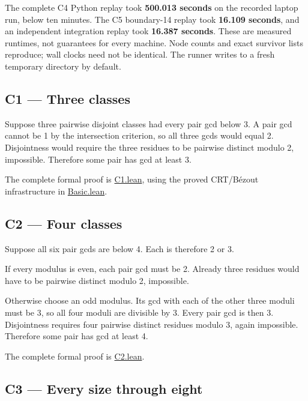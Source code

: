 \documentclass[11pt,a4paper]{article}
\begin{document}
The complete C4 Python replay took \textbf{500.013 seconds} on the recorded laptop run, below ten minutes. The C5 boundary-14 replay took \textbf{16.109 seconds}, and an independent integration replay took \textbf{16.387 seconds}. These are measured runtimes, not guarantees for every machine. Node counts and exact survivor lists reproduce; wall clocks need not be identical. The runner writes to a fresh temporary directory by default.

\subsection{C1 --- Three classes}\label{c1-three-classes}

Suppose three pairwise disjoint classes had every pair gcd below 3. A pair gcd cannot be 1 by the intersection criterion, so all three gcds would equal 2. Disjointness would require the three residues to be pairwise distinct modulo 2, impossible. Therefore some pair has gcd at least 3.

The complete formal proof is \href{https://github.com/mpelteshki/climbing-to-the-frontier/blob/ed55f76eb8c558825bb629fd2cd8dbf46e5f1314/cagent/p4/lean/ProofPursuit/P4/C1.lean}{C1.lean}, using the proved CRT/B\'{e}zout infrastructure in \href{https://github.com/mpelteshki/climbing-to-the-frontier/blob/ed55f76eb8c558825bb629fd2cd8dbf46e5f1314/cagent/p4/lean/ProofPursuit/P4/Basic.lean}{Basic.lean}.

\subsection{C2 --- Four classes}\label{c2-four-classes}

Suppose all six pair gcds are below 4. Each is therefore 2 or 3.

If every modulus is even, each pair gcd must be 2. Already three residues would have to be pairwise distinct modulo 2, impossible.

Otherwise choose an odd modulus. Its gcd with each of the other three moduli must be 3, so all four moduli are divisible by 3. Every pair gcd is then 3. Disjointness requires four pairwise distinct residues modulo 3, again impossible. Therefore some pair has gcd at least 4.

The complete formal proof is \href{https://github.com/mpelteshki/climbing-to-the-frontier/blob/ed55f76eb8c558825bb629fd2cd8dbf46e5f1314/cagent/p4/lean/ProofPursuit/P4/C2.lean}{C2.lean}.

\subsection{C3 --- Every size through eight}\label{c3-every-size-through-eight}
\end{document}
